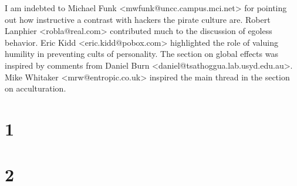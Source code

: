 \documentclass[a4paper,12pt,UTF8,twoside]{ctexbook}
\begin{document}
I am indebted to Michael Funk <mwfunk@uncc.campus.mci.net> for pointing out how instructive a contrast with hackers the pirate culture are. Robert Lanphier <robla@real.com> contributed much to the discussion of egoless behavior. Eric Kidd <eric.kidd@pobox.com> highlighted the role of valuing humility in preventing cults of personality. The section on global effects was inspired by comments from Daniel Burn <daniel@tsathoggua.lab.usyd.edu.au>. Mike Whitaker <mrw@entropic.co.uk> inspired the main thread in the section on acculturation.


\section{1}
\section{2}

\backmatter
\end{document}
